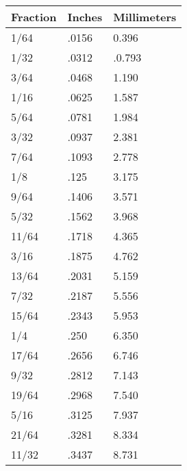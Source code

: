 \documentclass[12pt, letterpaper, oneside]{article}
\begin{document}
\begin{multicols}{2}
\sffamily

\begin{center}
\begin{tabular}{|l|l|l|}
\hline

\textbf{Fraction} & \textbf{Inches} & \textbf{Millimeters} \tabularnewline \hline

1/64 & .0156 & 0.396 \tabularnewline \hline

\rowcolor[rgb]{0.85,0.85,0.85} 1/32 & .0312 & .0.793 \tabularnewline \hline

3/64 & .0468 & 1.190 \tabularnewline \hline

\rowcolor[rgb]{0.85,0.85,0.85} 1/16 & .0625 & 1.587 \tabularnewline \hline

5/64 & .0781 & 1.984 \tabularnewline \hline

\rowcolor[rgb]{0.85,0.85,0.85} 3/32 & .0937 & 2.381 \tabularnewline \hline

7/64 & .1093 & 2.778 \tabularnewline \hline

\rowcolor[rgb]{0.85,0.85,0.85} 1/8 & .125 & 3.175 \tabularnewline \hline

9/64 & .1406 & 3.571 \tabularnewline \hline

\rowcolor[rgb]{0.85,0.85,0.85} 5/32 & .1562 & 3.968 \tabularnewline \hline

11/64 & .1718 & 4.365 \tabularnewline \hline

\rowcolor[rgb]{0.85,0.85,0.85} 3/16 & .1875 & 4.762 \tabularnewline \hline

13/64 & .2031 & 5.159 \tabularnewline \hline

\rowcolor[rgb]{0.85,0.85,0.85} 7/32 & .2187 & 5.556 \tabularnewline \hline

15/64 & .2343 & 5.953 \tabularnewline \hline

\rowcolor[rgb]{0.85,0.85,0.85} 1/4 & .250 & 6.350 \tabularnewline \hline

17/64 & .2656 & 6.746 \tabularnewline \hline

\rowcolor[rgb]{0.85,0.85,0.85} 9/32 & .2812 & 7.143 \tabularnewline \hline

19/64 & .2968 & 7.540 \tabularnewline \hline

\rowcolor[rgb]{0.85,0.85,0.85} 5/16 & .3125 & 7.937 \tabularnewline \hline

21/64 & .3281 & 8.334 \tabularnewline \hline

\rowcolor[rgb]{0.85,0.85,0.85} 11/32 & .3437 & 8.731 \tabularnewline \hline


\end{tabular}
\end{center}
\end{multicols}
\end{document}
